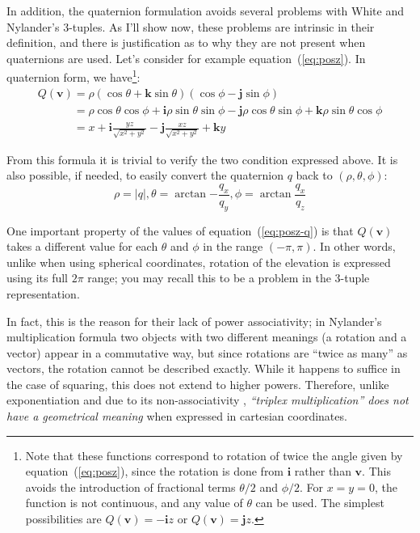 \documentclass{article}
\let\vec\mathbf
\newcommand{\mathnewline}[1][\quad]{\\\phantom{#1}}
\begin{document}
In addition, the quaternion formulation avoids several problems with
White and Nylander's 3-tuples.  As I'll show now, these problems are
intrinsic in their definition, and there is justification as to why
they are not present when quaternions are used.  Let's consider for
example equation~(\ref{eq:posz}).  In quaternion form, we
have\footnote{Note that these functions correspond to rotation of
  twice the angle given by equation~(\ref{eq:posz}), since the
  rotation is done from $\vec{i}$ rather than $\vec{v}$.  This avoids
  the introduction of fractional terms $\theta/2$ and $\phi/2$.
  For $x=y=0$, the function is not continuous, and any value
  of $\theta$ can be used.  The simplest possibilities are
  $Q(\vec{v}) = -\vec{i}z$ or $Q(\vec{v}) = \vec{j}z$.}:
\begin{equation}
  \label{eq:posz-q}
  \begin{array}{l}
  Q(\vec{v}) = \rho (\cos \theta + \vec{k} \sin \theta) (\cos \phi - \vec{j} \sin \phi)
  \mathnewline[Q(\vec{v})] = \rho \cos \theta \cos \phi + \vec{i} \rho \sin \theta \sin \phi - \vec{j} \rho \cos \theta \sin \phi + \vec{k} \rho \sin \theta \cos \phi
  \mathnewline[Q(\vec{v})] = x + \vec{i}\frac{y z}{\sqrt{x^2 + y^2}} - \vec{j}\frac{x z}{\sqrt{x^2 + y^2}} + \vec{k} y
\end{array}
\end{equation}

\noindent
From this formula it is trivial to verify the two condition expressed
above.  It is also possible, if needed, to easily convert the
quaternion $q$ back to $(\rho, \theta, \phi)$:
\begin{equation*}
  \rho = |q|, \theta = \arctan {-\frac{q_x}{q_y}}, \phi = \arctan \frac{q_x}{q_z}
\end{equation*}

One important property of the values of equation~(\ref{eq:posz-q}) is
that $Q(\vec{v})$ takes a different value for each $\theta$ and $\phi$
in the range $(-\pi, \pi)$.  In other words, unlike when using
spherical coordinates, rotation of the elevation is expressed using
its full $2\pi$ range; you may recall this to be a problem in the
3-tuple representation.

In fact, this is the reason for their lack of power
associativity; in Nylander's multiplication formula two objects with
two different meanings (a rotation and a vector) appear in a
commutative way, but since rotations are ``twice as many'' as vectors,
the rotation cannot be described exactly.  While it happens to suffice
in the case of squaring, this does not extend to higher powers.
Therefore, unlike exponentiation and due to its non-associativity
, \emph{``triplex multiplication'' does not have a geometrical meaning}
when expressed in cartesian coordinates.
\end{document}

